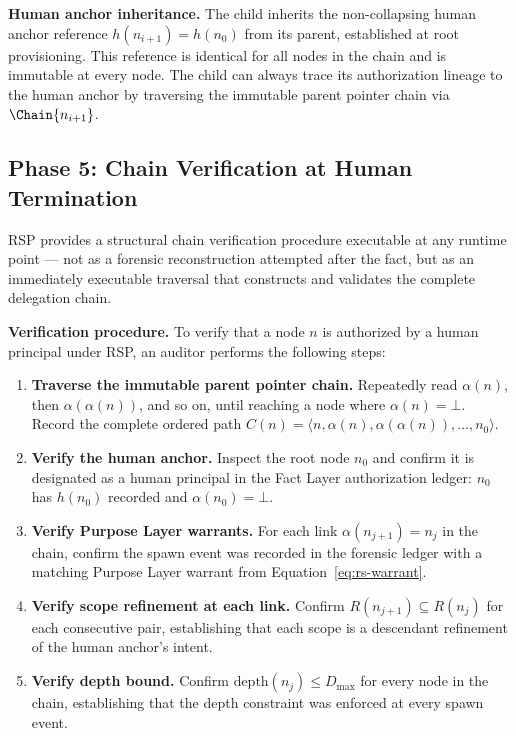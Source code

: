 \medskip
\noindent\textbf{Human anchor inheritance.} The child inherits the non-collapsing human anchor reference $h(n_{i+1}) = h(n_0)$ from its parent, established at root provisioning. This reference is identical for all nodes in the chain and is immutable at every node. The child can always trace its authorization lineage to the human anchor by traversing the immutable parent pointer chain via $\Chain{n_{i+1}}$.

\subsection{Phase 5: Chain Verification at Human Termination}
\label{sec:rs-phase5}

RSP provides a structural chain verification procedure executable at any runtime point — not as a forensic reconstruction attempted after the fact, but as an immediately executable traversal that constructs and validates the complete delegation chain.

\medskip
\noindent\textbf{Verification procedure.} To verify that a node $n$ is authorized by a human principal under RSP, an auditor performs the following steps:

\begin{enumerate}
    \item[(V1)] \textbf{Traverse the immutable parent pointer chain.} Repeatedly read $\alpha(n)$, then $\alpha(\alpha(n))$, and so on, until reaching a node where $\alpha(n) = \bot$. Record the complete ordered path $C(n) = \langle n, \alpha(n), \alpha(\alpha(n)), \ldots, n_0 \rangle$.

    \item[(V2)] \textbf{Verify the human anchor.} Inspect the root node $n_0$ and confirm it is designated as a human principal in the Fact Layer authorization ledger: $n_0$ has $h(n_0)$ recorded and $\alpha(n_0) = \bot$.

    \item[(V3)] \textbf{Verify Purpose Layer warrants.} For each link $\alpha(n_{j+1}) = n_j$ in the chain, confirm the spawn event was recorded in the forensic ledger with a matching Purpose Layer warrant from Equation~\ref{eq:rs-warrant}.

    \item[(V4)] \textbf{Verify scope refinement at each link.} Confirm $R(n_{j+1}) \subseteq R(n_j)$ for each consecutive pair, establishing that each scope is a descendant refinement of the human anchor's intent.

    \item[(V5)] \textbf{Verify depth bound.} Confirm $\text{depth}(n_j) \leq D_{\max}$ for every node in the chain, establishing that the depth constraint was enforced at every spawn event.
\end{enumerate}

